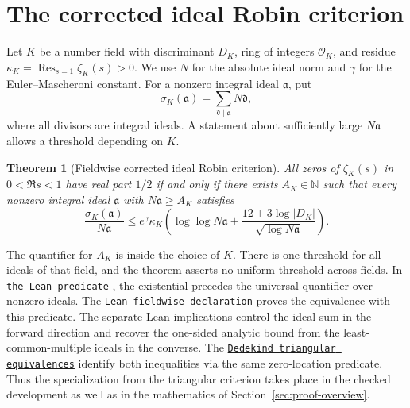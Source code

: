 \documentclass[11pt]{amsart}
\newtheorem{theorem}{Theorem}[section]
\theoremstyle{definition}
\theoremstyle{remark}
\numberwithin{equation}{section}
\newcommand{\repositoryurl}{https://github.com/kimihiro64/Robin1984}
\newcommand{\proofrevision}{b359826e62c50b6cef55db4b2fcab793232498cc}
\newcommand{\codelink}[2]{%
  \href{\repositoryurl/blob/\proofrevision/#1}{\texttt{#2}}}
\begin{document}
\section{The corrected ideal Robin criterion}\label{sec:grh}

Let \(K\) be a number field with discriminant \(D_K\), ring of
integers \(\mathcal O_K\), and residue
\(\kappa_K=\operatorname{Res}_{s=1}\zeta_K(s)>0\).
We use \(N\) for the absolute ideal norm and \(\gamma\) for the
Euler--Mascheroni constant. For a nonzero integral ideal
\(\mathfrak a\), put
\[
 \sigma_K(\mathfrak a)=\sum_{\mathfrak d\mid\mathfrak a}N\mathfrak d,
\]
where all divisors are integral ideals. A statement about sufficiently
large \(N\mathfrak a\) allows a threshold depending on \(K\).

\begin{theorem}[Fieldwise corrected ideal Robin criterion]
\label{thm:ideal-robin}
All zeros of \(\zeta_K(s)\) in \(0<\Re s<1\) have real part \(1/2\)
if and only if there exists \(A_K\in\mathbb N\) such that every
nonzero integral ideal \(\mathfrak a\) with \(N\mathfrak a\geq A_K\)
satisfies
\begin{equation}\label{eq:ideal-robin}
 \frac{\sigma_K(\mathfrak a)}{N\mathfrak a}
 \leq e^\gamma\kappa_K
 \left(\log\log N\mathfrak a+
           \frac{12+3\log|D_K|}{\sqrt{\log N\mathfrak a}}\right).
\end{equation}
\end{theorem}

The quantifier for \(A_K\) is inside the choice of \(K\). There
is one threshold for all ideals of that field, and the theorem
asserts no uniform threshold across fields. In
\codelink{Challenge.lean\#L81}{the Lean predicate}
, the
existential  precedes the universal quantifier
over nonzero ideals. The
\codelink{Solution.lean\#L318}{Lean fieldwise declaration} proves
the equivalence with this predicate.
The separate Lean implications control the ideal sum in the
forward direction and recover the one-sided analytic bound from
the least-common-multiple ideals in the converse. The
\codelink{Robin1984/GRH/DedekindTriangular.lean\#L396}{Dedekind triangular equivalences}
identify both inequalities via the same zero-location predicate.
Thus the specialization from the triangular criterion takes
place in the checked development as well as in the mathematics
of Section~\ref{sec:proof-overview}.
\end{document}
